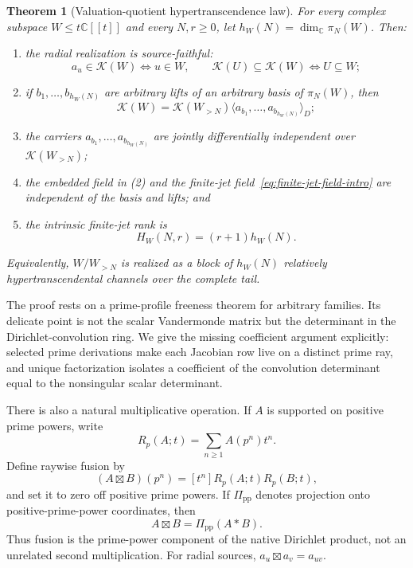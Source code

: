 \documentclass[11pt]{article}
\newtheorem{theorem}{Theorem}[section]
\theoremstyle{definition}
\theoremstyle{remark}
\newcommand{\C}{\mathbb C}
\newcommand{\K}{\mathcal K}
\begin{document}
\begin{theorem}[Valuation-quotient hypertranscendence law]\label{thm:master-intro}
For every complex subspace $W\le t\C[[t]]$ and every $N,r\ge0$, let
$h_W(N)=\dim_\C\pi_N(W)$.  Then:
\begin{enumerate}
\item the radial realization is source-faithful:
      \[
       a_u\in\K(W)\Longleftrightarrow u\in W,
       \qquad
       \K(U)\subseteq\K(W)\Longleftrightarrow U\subseteq W;
      \]
\item if $b_1,\ldots,b_{h_W(N)}$ are arbitrary lifts of an arbitrary basis of $\pi_N(W)$, then
      \[
       \K(W)=\K(W_{>N})\langle a_{b_1},\ldots,a_{b_{h_W(N)}}\rangle_D;
      \]
\item the carriers $a_{b_1},\ldots,a_{b_{h_W(N)}}$ are jointly differentially independent over
      $\K(W_{>N})$;
\item the embedded field in \emph{(2)} and the finite-jet field~\emph{\eqref{eq:finite-jet-field-intro}}
      are independent of the basis and lifts; and
\item the intrinsic finite-jet rank is
      \begin{equation}\label{eq:master-rank}
       H_W(N,r)=(r+1)h_W(N).
      \end{equation}
\end{enumerate}
Equivalently, $W/W_{>N}$ is realized as a block of $h_W(N)$ relatively
hypertranscendental channels over the complete tail.
\end{theorem}

The proof rests on a prime-profile freeness theorem for arbitrary families.  Its delicate point is
not the scalar Vandermonde matrix but the determinant in the Dirichlet-convolution ring.  We give
the missing coefficient argument explicitly: selected prime derivations make each Jacobian row
live on a distinct prime ray, and unique factorization isolates a coefficient of the convolution
determinant equal to the nonsingular scalar determinant.

There is also a natural multiplicative operation.  If $A$ is supported on positive prime powers,
write
\[
 R_p(A;t)=\sum_{n\ge1}A(p^n)t^n.
\]
Define raywise fusion by
\[
 (A\boxtimes B)(p^n)=[t^n]R_p(A;t)R_p(B;t),
\]
and set it to zero off positive prime powers.  If $\Pi_{\mathrm{pp}}$ denotes projection onto
positive-prime-power coordinates, then
\begin{equation}\label{eq:fusion-natural-intro}
 A\boxtimes B=\Pi_{\mathrm{pp}}(A*B).
\end{equation}
Thus fusion is the prime-power component of the native Dirichlet product, not an unrelated second
multiplication.  For radial sources, $a_u\boxtimes a_v=a_{uv}$.
\end{document}
